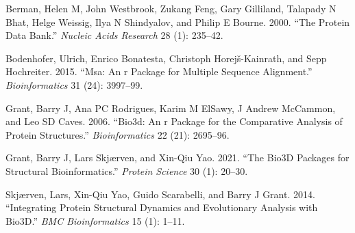 \documentclass[
]{article}
\newlength{\cslhangindent}
\newlength{\cslentryspacingunit} %
\newenvironment{CSLReferences}[2] %
 {%
  \setlength{\parindent}{0pt}
  \ifodd #1
  \let\oldpar\par
  \def\par{\hangindent=\cslhangindent\oldpar}
  \fi
  \setlength{\parskip}{#2\cslentryspacingunit}
 }%
 {}
\begin{document}
\hypertarget{refs}{}
\begin{CSLReferences}{1}{0}
\leavevmode{}%
Berman, Helen M, John Westbrook, Zukang Feng, Gary Gilliland, Talapady N
Bhat, Helge Weissig, Ilya N Shindyalov, and Philip E Bourne. 2000.
{``The Protein Data Bank.''} \emph{Nucleic Acids Research} 28 (1):
235--42.

\leavevmode{}%
Bodenhofer, Ulrich, Enrico Bonatesta, Christoph Horejš-Kainrath, and
Sepp Hochreiter. 2015. {``Msa: An r Package for Multiple Sequence
Alignment.''} \emph{Bioinformatics} 31 (24): 3997--99.

\leavevmode{}%
Grant, Barry J, Ana PC Rodrigues, Karim M ElSawy, J Andrew McCammon, and
Leo SD Caves. 2006. {``Bio3d: An r Package for the Comparative Analysis
of Protein Structures.''} \emph{Bioinformatics} 22 (21): 2695--96.

\leavevmode{}%
Grant, Barry J, Lars Skjærven, and Xin-Qiu Yao. 2021. {``The Bio3D
Packages for Structural Bioinformatics.''} \emph{Protein Science} 30
(1): 20--30.

\leavevmode{}%
Skjærven, Lars, Xin-Qiu Yao, Guido Scarabelli, and Barry J Grant. 2014.
{``Integrating Protein Structural Dynamics and Evolutionary Analysis
with Bio3D.''} \emph{BMC Bioinformatics} 15 (1): 1--11.

\end{CSLReferences}
\end{document}
